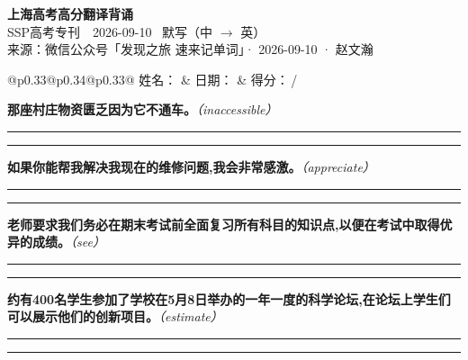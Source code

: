 \documentclass[11pt,a4paper]{article}
\newcommand{\num}[1]{\makebox[1.9em][r]{#1.}\hspace{0.3em}}
\newcommand{\wline}{\noindent\rule{\linewidth}{0.4pt}}
\newcommand{\prompt}[1]{\emph{\textcolor{tipblue}{\small（#1）}}}
\begin{document}
\pagestyle{plain}
\begin{center}
{\LARGE\bfseries 上海高考高分翻译背诵 }\\[0.25em]
{\large SSP高考专刊　2026-09-10 \quad\ 默写（中 $\to$ 英）}\\[0.35em]
{\footnotesize 来源：微信公众号「发现之旅 速来记单词」· 2026-09-10 · 赵文瀚}
\end{center}

\vspace{0.4em}
\noindent\begin{tabular}{@{}p{0.33\textwidth}@{}p{0.34\textwidth}@{}p{0.33\textwidth}@{}}
姓名：\underline{\hspace{2.0cm}} & 日期：\underline{\hspace{2.0cm}} & 得分：\underline{\hspace{1.4cm}}\,/ \\
\end{tabular}

\vspace{0.5em}

\vspace{0.8em}
\num{1}\textbf{那座村庄物资匮乏因为它不通车。}\prompt{inaccessible}

\vspace{0.3em}

\wline\vspace{0.3em}
\wline

\num{2}\textbf{如果你能帮我解决我现在的维修问题,我会非常感激。}\prompt{appreciate}

\vspace{0.3em}

\wline\vspace{0.3em}
\wline

\num{3}\textbf{老师要求我们务必在期末考试前全面复习所有科目的知识点,以便在考试中取得优异的成绩。}\prompt{see}

\vspace{0.3em}

\wline\vspace{0.3em}
\wline

\num{4}\textbf{约有400名学生参加了学校在5月8日举办的一年一度的科学论坛,在论坛上学生们可以展示他们的创新项目。}\prompt{estimate}

\vspace{0.3em}

\wline\vspace{0.3em}
\wline
\end{document}

